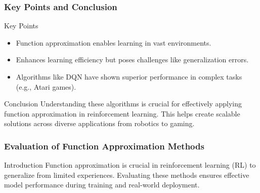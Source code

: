 \documentclass[aspectratio=169]{beamer}
\begin{document}
\begin{frame}[fragile]
  \frametitle{Key Points and Conclusion}
  \begin{block}{Key Points}
    \begin{itemize}
      \item Function approximation enables learning in vast environments.
      \item Enhances learning efficiency but poses challenges like generalization errors.
      \item Algorithms like DQN have shown superior performance in complex tasks (e.g., Atari games).
    \end{itemize}
  \end{block}
  
  \begin{block}{Conclusion}
    Understanding these algorithms is crucial for effectively applying function approximation in reinforcement learning. This helps create scalable solutions across diverse applications from robotics to gaming.
  \end{block}
\end{frame}

\begin{frame}[fragile]
  \frametitle{Evaluation of Function Approximation Methods}
  \begin{block}{Introduction}
    Function approximation is crucial in reinforcement learning (RL) to generalize from limited experiences. Evaluating these methods ensures effective model performance during training and real-world deployment.
  \end{block}
\end{frame}
\end{document}
